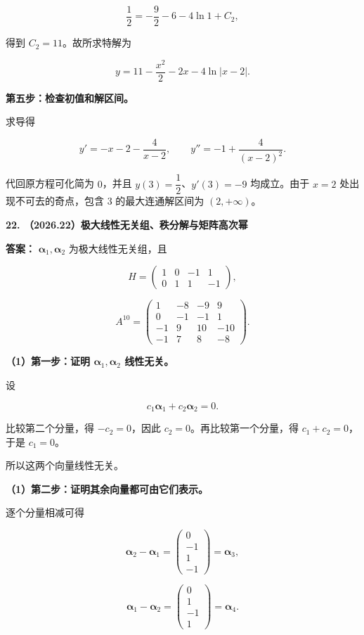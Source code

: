 \documentclass[UTF8,11pt,fontset=windows]{ctexart}
\begin{document}
$$
\frac12=-\frac92-6-4\ln1+C_2,
$$

得到 $C_2=11$。故所求特解为

$$
y=11-\frac{x^2}{2}-2x-4\ln|x-2|.
$$

\textbf{第五步：检查初值和解区间。}

求导得

$$
y'=-x-2-\frac4{x-2},
\qquad
 y''=-1+\frac4{(x-2)^2}.
$$

代回原方程可化简为 $0$，并且 $y(3)=\dfrac12$、$y'(3)=-9$ 均成立。由于 $x=2$ 处出现不可去的奇点，包含 $3$ 的最大连通解区间为 $(2,+\infty)$。

\clearpage

\textbf{22. （2026.22）极大线性无关组、秩分解与矩阵高次幂}

\textbf{答案：} $\boldsymbol{\alpha}_1,\boldsymbol{\alpha}_2$ 为极大线性无关组，且

$$
H=\begin{pmatrix}1&0&-1&1\\0&1&1&-1\end{pmatrix},
$$

$$
A^{10}=\begin{pmatrix}
1&-8&-9&9\\
0&-1&-1&1\\
-1&9&10&-10\\
-1&7&8&-8
\end{pmatrix}.
$$

\textbf{（1）第一步：证明 $\boldsymbol{\alpha}_1,\boldsymbol{\alpha}_2$ 线性无关。}

设

$$
c_1\boldsymbol{\alpha}_1+c_2\boldsymbol{\alpha}_2=0.
$$

比较第二个分量，得 $-c_2=0$，因此 $c_2=0$。再比较第一个分量，得 $c_1+c_2=0$，于是 $c_1=0$。

所以这两个向量线性无关。

\textbf{（1）第二步：证明其余向量都可由它们表示。}

逐个分量相减可得

$$
\boldsymbol{\alpha}_2-\boldsymbol{\alpha}_1
=\begin{pmatrix}0\\-1\\1\\-1\end{pmatrix}
=\boldsymbol{\alpha}_3,
$$

$$
\boldsymbol{\alpha}_1-\boldsymbol{\alpha}_2
=\begin{pmatrix}0\\1\\-1\\1\end{pmatrix}
=\boldsymbol{\alpha}_4.
$$
\end{document}
